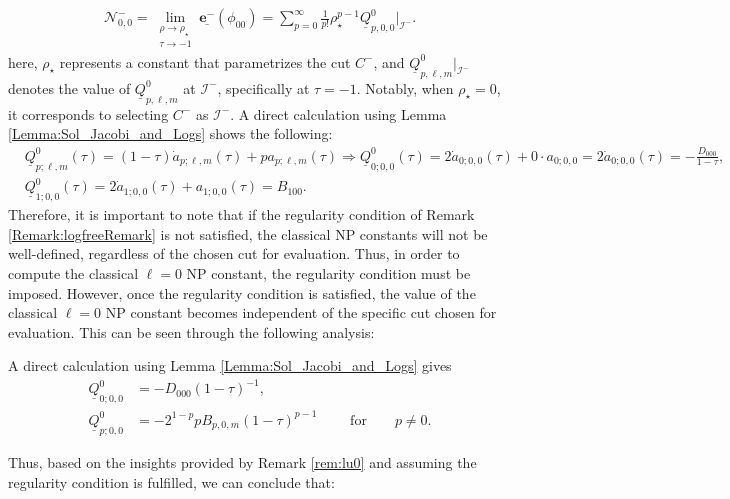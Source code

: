 \begin{align}
  \mathcal{N}^{-}_{0,0}= \lim_{\substack{\rho \to \rho_{\star} \\ \tau \to -1}}  \underline{\boldsymbol{e}^{-}}(\phi_{00}) = \sum_{p=0}^{\infty} \frac{1}{p!}\rho^{p-1}_{\star}\underline{Q}^{0}_{p,0,0}|_{\mathscr{I}^{-}}.
\end{align}
here, $\rho_{\star}$ represents a constant that parametrizes the cut ${C}^{-}$, and $\underline{Q}^{0}_{p,\ell,m}|_{\mathscr{I}^{-}}$ denotes the value of $\underline{Q}^{0}_{p,\ell,m}$ at $\mathscr{I}^{-}$, specifically at $\tau=-1$. Notably, when $\rho_{\star}=0$, it corresponds to selecting ${C}^{-}$ as $\mathcal{I}^{-}$.
A direct calculation using Lemma \ref{Lemma:Sol_Jacobi_and_Logs} shows the following:
\begin{align}\label{eq:Qu0lm}
  & \underline{Q}_{p;\ell,m}^{0}(\tau)=(1-\tau) \dot{a}_{p ; \ell, m}(\tau)+pa_{p ; \ell, m}(\tau) \Rightarrow \underline{Q}_{0;0,0}^{0}(\tau)=2 \dot{a}_{0;0,0}(\tau)+0 \cdot a_{0;0,0} =2 \dot{a}_{0;0,0}(\tau)=-\frac{D_{000}}{1-\tau}, \\
  & \underline{Q}_{1;0,0}^{0}(\tau)=2 \dot{a}_{1;0,0}(\tau)+ a_{1;0,0}(\tau)=B_{100}.
\end{align}
Therefore, it is important to note that if the regularity condition of Remark \ref{Remark:logfreeRemark} is not satisfied, the classical NP constants will not be well-defined, regardless of the chosen cut for evaluation. Thus, in order to compute the classical $\ell=0$ NP constant, the regularity condition must be imposed. However, once the regularity condition is satisfied, the value of the classical $\ell=0$ NP constant becomes independent of the specific cut chosen for evaluation. This can be seen through the following analysis:
\begin{remark}\label{rem:lu0}
  A direct calculation
using Lemma \ref{Lemma:Sol_Jacobi_and_Logs}
gives
 \begin{subequations}\label{eq:rem:lu0}
 \begin{align}
   \underline{Q}^{0}_{0;0,0}&=-D_{000}(1-\tau)^{-1},\label{rem:lu0:eq1} \\
   \underline{Q}^{0}_{p;0,0}&=-2^{1-p}pB_{p,0,m}(1-\tau)^{p-1} \qquad \text{ for}\qquad p\neq 0.
   \label{rem:lu0:eq2}
 \end{align}
\end{subequations}
\end{remark}
Thus, based on the insights provided by Remark \ref{rem:lu0} and assuming the regularity condition is fulfilled, we can conclude that:
